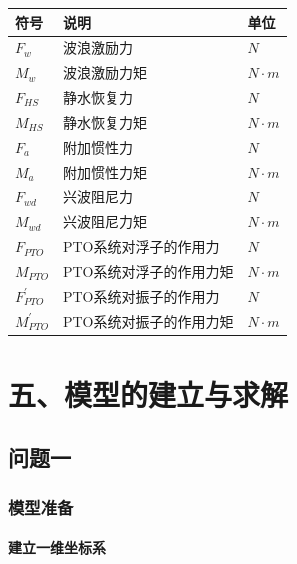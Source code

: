 \documentclass{my_paper}
\newcommand{\subsubsubsection}[1]{\paragraph{#1}\mbox{}\\}
\begin{document}
\newpage

\begin{table}[h]%
    \centering
    \begin{tabular}{p{2.0cm}<{\centering}p{9.0cm}<{\centering}p{2.0cm}<{\centering}}
    \hline
    符号 & 说明 & 单位 \\ %
    \hline
    $F_{w}$       &波浪激励力&  $N$ \\
    $M_{w}$       &波浪激励力矩&  $N\cdot m$ \\
    $F_{HS}$       &静水恢复力&  $N$ \\
    $M_{HS}$       &静水恢复力矩&  $N\cdot m$ \\
    $F_{a}$       &附加惯性力&  $N$ \\
    $M_{a}$       &附加惯性力矩&  $N\cdot m$ \\
    $F_{wd}$       &兴波阻尼力&  $N$ \\
    $M_{wd}$       &兴波阻尼力矩&  $N\cdot m$ \\
    $F_{PTO}$       &PTO系统对浮子的作用力&  $N$ \\
    $M_{PTO}$       &PTO系统对浮子的作用力矩&  $N\cdot m$ \\
    $F_{PTO}^{'}$       &PTO系统对振子的作用力&  $N$ \\
    $M_{PTO}^{'}$       &PTO系统对振子的作用力矩&  $N\cdot m$ \\
    
    \hline
    \end{tabular}
\end{table}



\section{五、模型的建立与求解}

\subsection{问题一}

\subsubsection{模型准备}

\subsubsubsection{建立一维坐标系}
\end{document}
